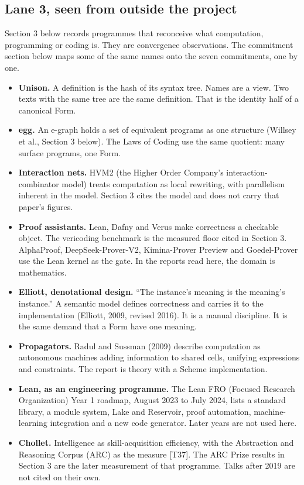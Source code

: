 \documentclass[10pt,letterpaper]{article}
\providecommand{\tightlist}{\setlength{\itemsep}{1pt}\setlength{\parskip}{0pt}}
\begin{document}
\subsection{Lane 3, seen from outside the
project}\label{lane-3-seen-from-outside-the-project}

Section 3 below records programmes that reconceive what computation,
programming or coding is. They are convergence observations. The
commitment section below maps some of the same names onto the seven
commitments, one by one.

\begin{itemize}
\tightlist
\item
  \textbf{Unison.} A definition is the hash of its syntax tree. Names
  are a view. Two texts with the same tree are the same definition. That
  is the identity half of a canonical Form.
\item
  \textbf{egg.} An e-graph holds a set of equivalent programs as one
  structure (Willsey et al., Section 3 below). The Laws of Coding use
  the same quotient: many surface programs, one Form.
\item
  \textbf{Interaction nets.} HVM2 (the Higher Order Company's
  interaction-combinator model) treats computation as local rewriting,
  with parallelism inherent in the model. Section 3 cites the model and
  does not carry that paper's figures.
\item
  \textbf{Proof assistants.} Lean, Dafny and Verus make correctness a
  checkable object. The vericoding benchmark is the measured floor cited
  in Section 3. AlphaProof, DeepSeek-Prover-V2, Kimina-Prover Preview
  and Goedel-Prover use the Lean kernel as the gate. In the reports read
  here, the domain is mathematics.
\item
  \textbf{Elliott, denotational design.} ``The instance's meaning is the
  meaning's instance.'' A semantic model defines correctness and carries
  it to the implementation (Elliott, 2009, revised 2016). It is a manual
  discipline. It is the same demand that a Form have one meaning.
\item
  \textbf{Propagators.} Radul and Sussman (2009) describe computation as
  autonomous machines adding information to shared cells, unifying
  expressions and constraints. The report is theory with a Scheme
  implementation.
\item
  \textbf{Lean, as an engineering programme.} The Lean FRO (Focused
  Research Organization) Year 1 roadmap, August 2023 to July 2024, lists
  a standard library, a module system, Lake and Reservoir, proof
  automation, machine-learning integration and a new code generator.
  Later years are not used here.
\item
  \textbf{Chollet.} Intelligence as skill-acquisition efficiency, with
  the Abstraction and Reasoning Corpus (ARC) as the measure {[}T37{]}.
  The ARC Prize results in Section 3 are the later measurement of that
  programme. Talks after 2019 are not cited on their own.
\end{itemize}
\end{document}
